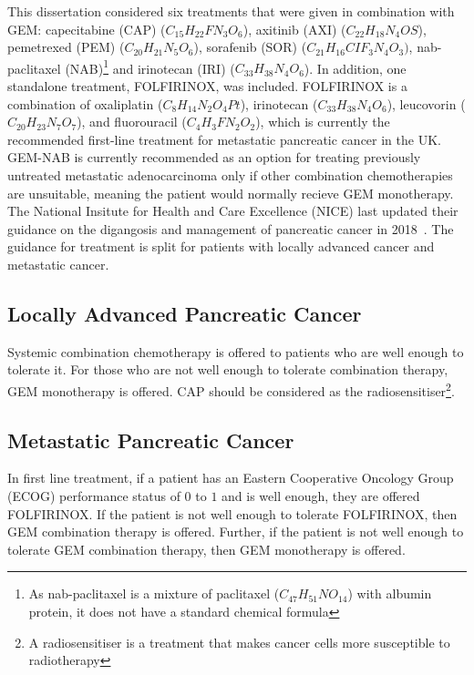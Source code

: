 This dissertation considered six treatments that were given in combination with GEM: capecitabine (CAP) ($C_{15}H_{22}FN_3O_6$), axitinib (AXI) ($C_{22}H_{18}N_4OS$), pemetrexed (PEM) ($C_{20}H_{21}N_5O_6$), sorafenib (SOR) ($C_{21}H_{16}CIF_{3}N_4O_3)$, nab-paclitaxel (NAB)\footnote{As nab-paclitaxel is a mixture of paclitaxel ($C_{47}H_{51}NO_{14}$) with albumin protein, it does not have a standard chemical formula} and irinotecan (IRI) ($C_{33}H_{38}N_4O_6$). In addition, one standalone treatment, FOLFIRINOX, was included. FOLFIRINOX is a combination of oxaliplatin ($C_{8}H_{14}N_{2}O_{4}Pt$), irinotecan ($C_{33}H_{38}N_{4}O_{6}$), leucovorin ($C_{20}H_{23}N_{7}O_{7}$), and fluorouracil ($C_{4}H_{3}FN_{2}O_{2}$), which is currently the recommended first-line treatment for metastatic pancreatic cancer in the UK. GEM-NAB is currently recommended as an option for treating previously untreated metastatic adenocarcinoma only if other combination chemotherapies are unsuitable, meaning the patient would normally recieve GEM monotherapy.\\

The National Insitute for Health and Care Excellence (NICE) last updated their guidance on the digangosis and management of pancreatic cancer in 2018~\cite{NG85}. The guidance for treatment is split for patients with locally advanced cancer and metastatic cancer. 

\subsection{Locally Advanced Pancreatic Cancer}
Systemic combination chemotherapy is offered to patients who are well enough to tolerate it. For those who are not well enough to tolerate combination therapy, GEM monotherapy is offered. CAP should be considered as the radiosensitiser\footnote{A radiosensitiser is a treatment that makes cancer cells more susceptible to radiotherapy}.

\subsection{Metastatic Pancreatic Cancer}
In first line treatment, if a patient has an Eastern Cooperative Oncology Group (ECOG) performance status of $0$ to $1$ and is well enough, they are offered FOLFIRINOX. If the patient is not well enough to tolerate FOLFIRINOX, then GEM combination therapy is offered. Further, if the patient is not well enough to tolerate GEM combination therapy, then GEM monotherapy is offered.  \\

